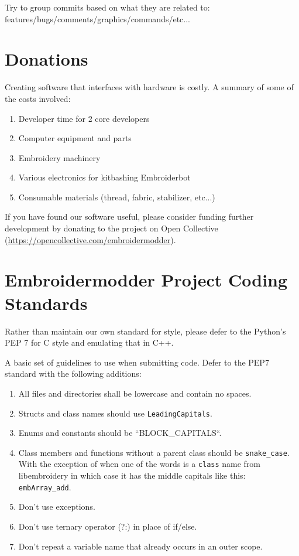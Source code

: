 \documentclass[10pt]{report}
\begin{document}
Try to group commits based on what they are related to: features/bugs/comments/graphics/commands/etc...

\section{Donations}

Creating software that interfaces with hardware is costly. A summary of some of the costs involved:

\begin{enumerate}
\item Developer time for 2 core developers
\item Computer equipment and parts
\item Embroidery machinery
\item Various electronics for kitbashing Embroiderbot
\item Consumable materials (thread, fabric, stabilizer, etc...)
\end{enumerate}

If you have found our software useful, please consider funding further development by donating to the project on Open Collective
(\url{https://opencollective.com/embroidermodder}).

\section{Embroidermodder Project Coding Standards}

Rather than maintain our own standard for style, please defer to
the Python's PEP 7 %
for C style and emulating that in C++.

A basic set of guidelines to use when submitting code. Defer to the PEP7 standard with the following additions:

\begin{enumerate}
\item All files and directories shall be lowercase and contain no spaces.
\item Structs and class names should use \texttt{LeadingCapitals}.
\item Enums and constants should be ``BLOCK\_CAPITALS``.
\item Class members and functions without a parent class should be
    \texttt{snake\_case}. With the exception of when one of the words is a
    \texttt{class} name from libembroidery in which case it has the middle capitals
    like this: \texttt{embArray\_add}.
\item Don't use exceptions.
\item Don't use ternary operator (?:) in place of if/else.
\item Don't repeat a variable name that already occurs in an outer scope.
\end{enumerate}
\end{document}
